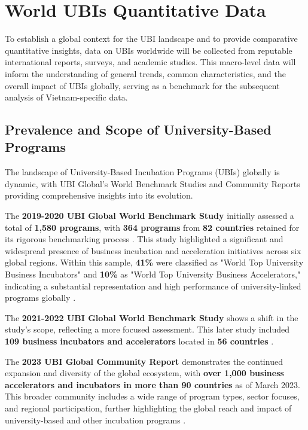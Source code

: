 \documentclass[../Main.tex]{subfiles}%
\begin{document}
	\section{World UBIs Quantitative Data}
	To establish a global context for the UBI landscape and to provide comparative quantitative insights, data on UBIs worldwide will be collected from reputable international reports, surveys, and academic studies. This macro-level data will inform the understanding of general trends, common characteristics, and the overall impact of UBIs globally, serving as a benchmark for the subsequent analysis of Vietnam-specific data.
	
	\subsection{Prevalence and Scope of University-Based Programs}
	The landscape of University-Based Incubation Programs (UBIs) globally is dynamic, with UBI Global's World Benchmark Studies and Community Reports providing comprehensive insights into its evolution.
	
	The \textbf{2019-2020 UBI Global World Benchmark Study} initially assessed a total of \textbf{1,580 programs}, with \textbf{364 programs} from \textbf{82 countries} retained for its rigorous benchmarking process \cite{ubi2019world}. This study highlighted a significant and widespread presence of business incubation and acceleration initiatives across six global regions. Within this sample, \textbf{41\%} were classified as "World Top University Business Incubators" and \textbf{10\%} as "World Top University Business Accelerators," indicating a substantial representation and high performance of university-linked programs globally \cite{ubi2019world}.
	
	The \textbf{2021-2022 UBI Global World Benchmark Study} shows a shift in the study's scope, reflecting a more focused assessment. This later study included \textbf{109 business incubators and accelerators} located in \textbf{56 countries} \cite{ubi2021world}.
	
	The \textbf{2023 UBI Global Community Report} demonstrates the continued expansion and diversity of the global ecosystem, with \textbf{over 1,000 business accelerators and incubators in more than 90 countries} as of March 2023. This broader community includes a wide range of program types, sector focuses, and regional participation, further highlighting the global reach and impact of university-based and other incubation programs \cite{Amin2024Incubators}.
	
\end{document}
